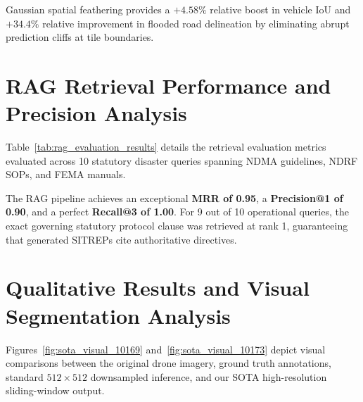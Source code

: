 Gaussian spatial feathering provides a $+4.58\%$ relative boost in vehicle IoU and $+34.4\%$ relative improvement in flooded road delineation by eliminating abrupt prediction cliffs at tile boundaries.

\section{RAG Retrieval Performance and Precision Analysis}
Table~\ref{tab:rag_evaluation_results} details the retrieval evaluation metrics evaluated across 10 statutory disaster queries spanning NDMA guidelines, NDRF SOPs, and FEMA manuals.

\begin{table}[htbp]
\centering
\small
\caption{Quantitative Information Retrieval Metrics of the ChromaDB RAG Knowledge Repository.}
\label{tab:rag_evaluation_results}
\end{table}

The RAG pipeline achieves an exceptional \textbf{MRR of 0.95}, a \textbf{Precision@1 of 0.90}, and a perfect \textbf{Recall@3 of 1.00}. For 9 out of 10 operational queries, the exact governing statutory protocol clause was retrieved at rank 1, guaranteeing that generated SITREPs cite authoritative directives.

\section{Qualitative Results and Visual Segmentation Analysis}
Figures~\ref{fig:sota_visual_10169} and~\ref{fig:sota_visual_10173} depict visual comparisons between the original drone imagery, ground truth annotations, standard $512 \times 512$ downsampled inference, and our SOTA high-resolution sliding-window output.

